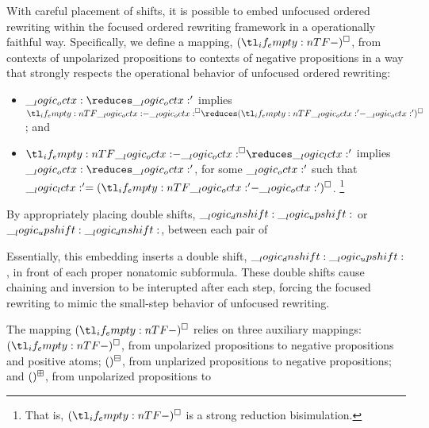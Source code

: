 With careful placement of shifts, it is possible to embed unfocused ordered rewriting within the focused ordered rewriting framework in a operationally faithful way.
Specifically, we define a mapping, $\embed*{}$, from contexts of unpolarized propositions to contexts of negative propositions in a way that strongly respects the operational behavior of unfocused ordered rewriting:
\begin{itemize}[noitemsep]
\item $\octx \reduces \octx'$ implies $\embed{\octx} \reduces \embed*{\octx'}$; and
\item $\embed{\octx} \reduces \lctx'$ implies $\octx \reduces \octx'$, for some $\__logic_octx:'$ such that $\lctx' = \embed*{\octx'}$.%
  \footnote{That is, $\embed*{}$ is a strong reduction bisimulation\textcite{Sangiorgi+Walker:CUP03}.}
\end{itemize}

By appropriately placing double shifts, $\__logic_dnshift: \__logic_upshift:$ or $\__logic_upshift: \__logic_dnshift:$, between each pair of 

Essentially, this embedding inserts a double shift, $\__logic_dnshift: \__logic_upshift:$, in front of each proper nonatomic subformula.
These double shifts cause chaining and inversion to be interupted after each step, forcing the focused rewriting to mimic the small-step behavior of unfocused rewriting.

The mapping $\embed*{}$ relies on three auxiliary mappings: $\embed*{}$, from unpolarized propositions to negative propositions and positive atoms; $\embedn*{}$, from unplarized propositions to negative propositions; and $\embedp*{}$, from unpolarized propositions to 

